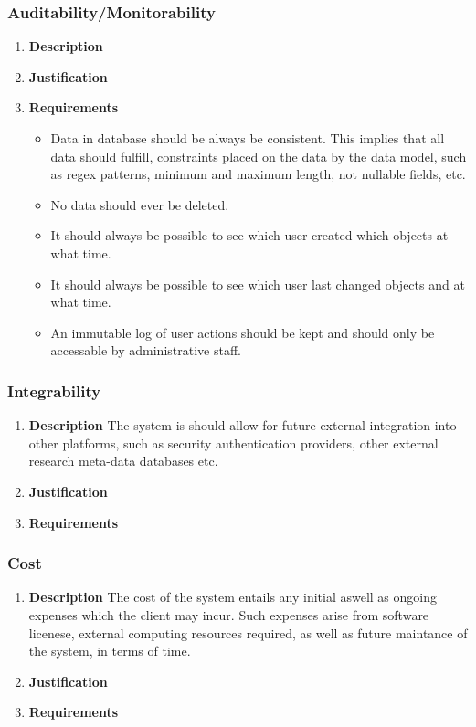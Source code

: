 \documentclass[a4paper,10pt]{article}
\begin{document}
\subsubsection{Auditability/Monitorability}
\begin{enumerate}
\item \textbf{Description}
\item \textbf{Justification}
\item \textbf{Requirements}
	\begin{itemize}
	\item Data in database should be always be consistent. This implies that all data should fulfill, constraints placed on the data by the data model, such as regex patterns, minimum and maximum length, not nullable fields, etc.
	\item No data should ever be deleted.
	\item It should always be possible to see which user created which objects at what time.
	\item It should always be possible to see which user last changed objects and at what time.
	\item An immutable log of user actions should be kept and should only be accessable by administrative staff.
	\end{itemize}
\end{enumerate}

\subsubsection{Integrability}
\begin{enumerate}
\item \textbf{Description}
The system is should allow for future external integration into other platforms, such as security authentication providers, other external research meta-data databases etc.
\item \textbf{Justification}
\item \textbf{Requirements}
\end{enumerate}

\subsubsection{Cost}
\begin{enumerate}
\item \textbf{Description}
The cost of the system entails any initial aswell as ongoing expenses which the client may incur. Such expenses arise from software licenese, external computing resources required, as well as future maintance of the system, in terms of time.
\item \textbf{Justification}
\item \textbf{Requirements}
\end{enumerate}
\end{document}
